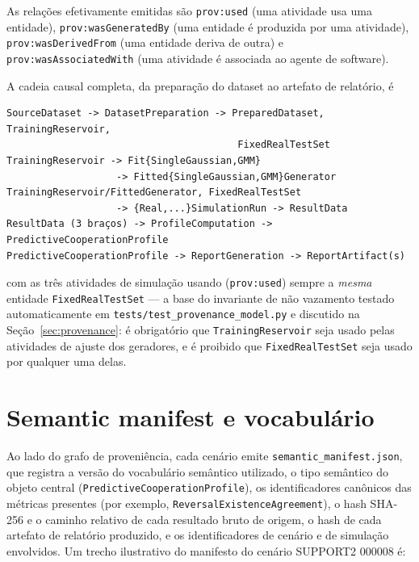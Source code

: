 \begin{sloppypar}
As relações efetivamente emitidas são \texttt{prov:used} (uma atividade usa uma entidade), \texttt{prov:wasGeneratedBy} (uma entidade é produzida por uma atividade), \texttt{prov:wasDerivedFrom} (uma entidade deriva de outra) e \texttt{prov:wasAssociatedWith} (uma atividade é associada ao agente de software).
\end{sloppypar}
A cadeia causal completa, da preparação do dataset ao artefato de relatório, é

\begin{center}
\scriptsize
\begin{verbatim}
SourceDataset -> DatasetPreparation -> PreparedDataset, TrainingReservoir,
                                        FixedRealTestSet
TrainingReservoir -> Fit{SingleGaussian,GMM}
                   -> Fitted{SingleGaussian,GMM}Generator
TrainingReservoir/FittedGenerator, FixedRealTestSet
                   -> {Real,...}SimulationRun -> ResultData
ResultData (3 braços) -> ProfileComputation -> PredictiveCooperationProfile
PredictiveCooperationProfile -> ReportGeneration -> ReportArtifact(s)
\end{verbatim}
\end{center}

\noindent com as três atividades de simulação usando (\texttt{prov:used}) sempre a \emph{mesma} entidade \texttt{FixedRealTestSet} --- a base do invariante de não vazamento testado automaticamente em \texttt{tests/test\_provenance\_model.py} e discutido na Seção~\ref{sec:provenance}: é obrigatório que \texttt{TrainingReservoir} seja usado pelas atividades de ajuste dos geradores, e é proibido que \texttt{FixedRealTestSet} seja usado por qualquer uma delas.

\section{Semantic manifest e vocabulário}

Ao lado do grafo de proveniência, cada cenário emite \texttt{semantic\_manifest.json}, que registra a versão do vocabulário semântico utilizado, o tipo semântico do objeto central (\texttt{PredictiveCooperationProfile}), os identificadores canônicos das métricas presentes (por exemplo, \texttt{ReversalExistenceAgreement}), o hash SHA-256 e o caminho relativo de cada resultado bruto de origem, o hash de cada artefato de relatório produzido, e os identificadores de cenário e de simulação envolvidos. Um trecho ilustrativo do manifesto do cenário SUPPORT2 000008 é:

